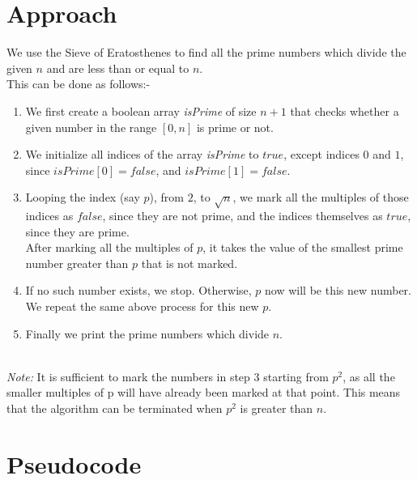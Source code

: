 \documentclass[11pt]{article}
\begin{document}
\section{Approach}
We use the Sieve of Eratosthenes to find all the prime numbers which divide the given $n$ and are less than or equal to $n$. \\
This can be done as follows:-
\begin{enumerate}
    \item We first create a boolean array \textit{isPrime} of size $n + 1$ that checks whether a given number in the range $[0, n]$ is prime or not.
    \item We initialize all indices of the array \textit{isPrime} to $true$, except indices $0$ and $1$, since $isPrime[0] = false$, and $isPrime[1] = false$.
    \item Looping the index (say $p$), from $2$, to $\sqrt{n}$, we mark all the multiples of those indices as $false$, since they are not prime, and the indices themselves as $true$, since they are prime.\\
    After marking all the multiples of $p$, it takes the value of the smallest prime number greater than $p$ that is not marked.
    \item If no such number exists, we stop. Otherwise, $p$ now will be this new number. We repeat the same above process for this new $p$.
    \item Finally we print the prime numbers which divide $n$.
\end{enumerate}
\\
\textit{Note:} It is sufficient to mark the numbers in step 3 starting from $p^2$, as all the smaller multiples of p will have already been marked at that point. This means that the algorithm can be terminated  when $p^2$ is greater than $n$.\\




\section{Pseudocode}
\end{document}
